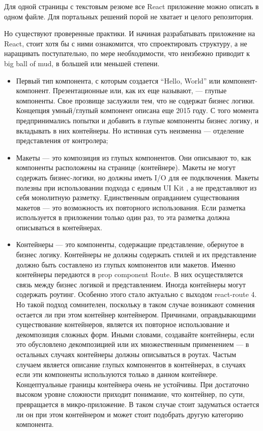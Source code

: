 Для одной страницы с текстовым резюме все React приложение можно описать в одном файле. Для портальных решений порой не хватает и целого репозитория.

Но существуют проверенные практики.
И начиная разрабатывать приложение на React, стоит хотя бы с ними ознакомится, что спроектировать структуру, а не наращивать поступательно, по мере необходимости, что неизбежно приводит к big ball of mud, в большей или меньшей степени.



\begin{itemize}
    \item Первый тип компонента, с которым создается “Hello, World” или компонент-компонент.
    Презентационные или, как их еще называют, — глупые компоненты. Свое прозвище заслужили тем, что не содержат бизнес логики.
    Концепция умный/глупый компонент описана еще 2015 году.
    С того момента предпринимались попытки и добавить в глупые компоненты бизнес логику, и вкладывать в них контейнеры.
    Но истинная суть неизменна — отделение представления от контролера;
    \item Макеты — это композиция из глупых компонентов.
    Они описывают то, как компоненты расположены на странице (контейнере).
    Макеты не могут содержать бизнес-логики, но должны иметь I/O для ее подключения.
    Макеты полезны при использовании подхода с единым UI Kit , а не представляют из себя монолитную разметку.
    Единственным оправданием существования макетов — это возможность их повторного использования.
    Если разметка используется в приложении только один раз, то эта разметка должна описываться в контейнерах.
    \item Контейнеры — это компоненты, содержащие представление, обернутое в бизнес логику.
    Контейнеры не должны содержать стилей и их представление должно быть составлено из глупых компонентов или макетов.
    Именно контейнеры передаются в prop component Route. В них осуществляется связь между бизнес логикой и представлением.
    Иногда контейнеры могут содержать роутинг. Особенно этого стало актуально с выходом react-route 4.
    Но такой подход сомнителен, поскольку в таком случае возникают сомнения остается ли при этом контейнер контейнером.
    Причинами, оправдывающими существование контейнеров, является их повторное использование и декомпозиция сложных форм.
    Иными словами, создавайте контейнеры, если это обусловлено декомпозицией или их множественным применением — в остальных случаях контейнеры должны описываться в роутах.
    Частым случаем является описание глупых компонентов в контейнерах, в случаях если эти компоненты используются только в данном контейнере.
    Концептуальные границы контейнера очень не устойчивы.
    При достаточно высоком уровне сложности приходит понимание, что контейнер, по сути, превращается в микро-приложение.
    В таком случае стоит задуматься остается ли он при этом контейнером и может стоит подобрать другую категорию компонента.
\end{itemize}


